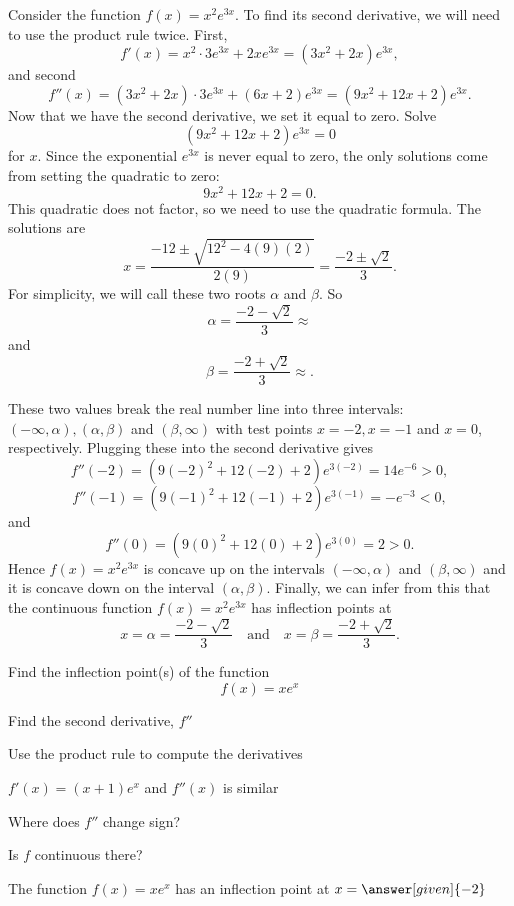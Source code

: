 \documentclass{ximera}
\begin{document}
\begin{example} %
Consider the function $f(x) = x^2e^{3x}$.  To find its second derivative, 
we will need to use the product rule twice. First, 
\[f'(x) = x^2 \cdot 3e^{3x} + 2xe^{3x} = (3x^2 + 2x)e^{3x},\]
and second
\[f''(x) = (3x^2 + 2x)\cdot 3e^{3x} + (6x + 2)e^{3x} = (9x^2 + 12x + 2)e^{3x}.\]
Now that we have the second derivative, we set it equal to zero.  Solve
\[(9x^2 + 12x + 2)e^{3x}=0\]
for $x$.
Since the exponential $e^{3x}$ is never equal to zero, the only solutions come from setting the quadratic to zero:
\[9x^2 + 12x + 2=0.\]
This quadratic does not factor, so we need to use the quadratic formula.
The solutions are 
\[x = \frac{-12 \pm \sqrt{12^2 - 4(9)(2)}}{2(9)} = \frac{-2 \pm \sqrt{2}}{3}.\]
For simplicity, we will call these two roots $\alpha$ and $\beta$.
So 
\[\alpha = \frac{-2 - \sqrt{2}}{3} \approx \]
and
\[\beta = \frac{-2 + \sqrt{2}}{3} \approx .\]

These two values break the real number line into three intervals: $(-\infty, \alpha), 
(\alpha, \beta)$ and $(\beta, \infty)$ with test points
$x = -2, x = -1$ and $x = 0$, respectively.
Plugging these into the second derivative gives
\[f''(-2) = (9(-2)^2 + 12(-2) + 2)e^{3(-2)} = 14e^{-6} > 0,\]
\[f''(-1) = (9(-1)^2 + 12(-1) + 2)e^{3(-1)} = -e^{-3} < 0,\]
and
\[f''(0) = (9(0)^2 + 12(0) + 2)e^{3(0)} = 2 > 0.\]
Hence $f(x) = x^2 e^{3x}$ is concave up on the intervals $(-\infty, \alpha)$ 
and $(\beta, \infty)$ and it is concave down on the interval 
$(\alpha, \beta)$.
Finally, we can infer from this that the continuous function $f(x) = x^2 e^{3x}$ has inflection points at 
\[
x = \alpha= \dfrac{-2 - \sqrt{2}}{3} \quad \text{and} \quad x = \beta = \dfrac{-2 + \sqrt{2}}{3}.
\]
\end{example}

\begin{problem} %
  Find the inflection point(s) of the function
  \[
     f(x) = xe^x
  \]
  
    \begin{hint}
      Find the second derivative, $f''$
    \end{hint}
    \begin{hint}
      Use the product rule to compute the derivatives
    \end{hint}
		\begin{hint}
      $f'(x) = (x+1)e^x$ and $f''(x)$ is similar
    \end{hint}
		\begin{hint}
      Where does $f''$ change sign?
    \end{hint}
    \begin{hint}
      Is $f$ continuous there?
    \end{hint}  
		The function $f(x) = xe^x$ has an inflection 
		point at $x =\answer[given]{-2}$
		
\end{problem}
\end{document}
